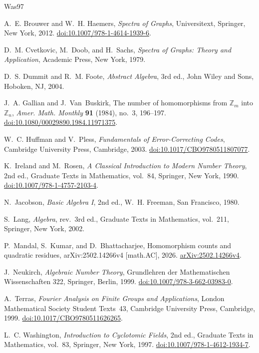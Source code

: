 \documentclass[12pt]{amsart}
\numberwithin{equation}{section}
\theoremstyle{plain}
\theoremstyle{definition}
\begin{document}
\clearpage
\begin{thebibliography}{Was97}

A.~E. Brouwer and W.~H. Haemers,
\textit{Spectra of Graphs},
Universitext, Springer, New York, 2012.
\newblock \href{https://doi.org/10.1007/978-1-4614-1939-6}{doi:10.1007/978-1-4614-1939-6}.

D.~M. Cvetkovic, M.~Doob, and H.~Sachs,
\textit{Spectra of Graphs: Theory and Application},
Academic Press, New York, 1979.

D.~S. Dummit and R.~M. Foote,
\textit{Abstract Algebra}, 3rd ed.,
John Wiley and Sons, Hoboken, NJ, 2004.

J.~A. Gallian and J.~Van~Buskirk,
The number of homomorphisms from $\mathbb{Z}_m$ into $\mathbb{Z}_n$,
\textit{Amer. Math. Monthly} \textbf{91} (1984), no.~3, 196--197.
\newblock \href{https://doi.org/10.1080/00029890.1984.11971375}{doi:10.1080/00029890.1984.11971375}.

W.~C. Huffman and V.~Pless,
\textit{Fundamentals of Error-Correcting Codes},
Cambridge University Press, Cambridge, 2003.
\newblock \href{https://doi.org/10.1017/CBO9780511807077}{doi:10.1017/CBO9780511807077}.

K.~Ireland and M.~Rosen,
\textit{A Classical Introduction to Modern Number Theory}, 2nd ed.,
Graduate Texts in Mathematics, vol.~84, Springer, New York, 1990.
\newblock \href{https://doi.org/10.1007/978-1-4757-2103-4}{doi:10.1007/978-1-4757-2103-4}.

N.~Jacobson,
\textit{Basic Algebra I}, 2nd ed.,
W.~H. Freeman, San Francisco, 1980.

S.~Lang,
\textit{Algebra}, rev.\ 3rd ed.,
Graduate Texts in Mathematics, vol.~211, Springer, New York, 2002.

P.~Mandal, S.~Kumar, and D.~Bhattacharjee,
Homomorphism counts and quadratic residues,
arXiv:2502.14266v4 [math.AC], 2026.
\newblock \href{https://arxiv.org/abs/2502.14266v4}{arXiv:2502.14266v4}.

J.~Neukirch,
\textit{Algebraic Number Theory},
Grundlehren der Mathematischen Wissenschaften 322,
Springer, Berlin, 1999.
\newblock \href{https://doi.org/10.1007/978-3-662-03983-0}{doi:10.1007/978-3-662-03983-0}.

A.~Terras,
\textit{Fourier Analysis on Finite Groups and Applications},
London Mathematical Society Student Texts~43,
Cambridge University Press, Cambridge, 1999.
\newblock \href{https://doi.org/10.1017/CBO9780511626265}{doi:10.1017/CBO9780511626265}.

L.~C. Washington,
\textit{Introduction to Cyclotomic Fields}, 2nd ed.,
Graduate Texts in Mathematics, vol.~83, Springer, New York, 1997.
\newblock \href{https://doi.org/10.1007/978-1-4612-1934-7}{doi:10.1007/978-1-4612-1934-7}.

\end{thebibliography}
\end{document}
